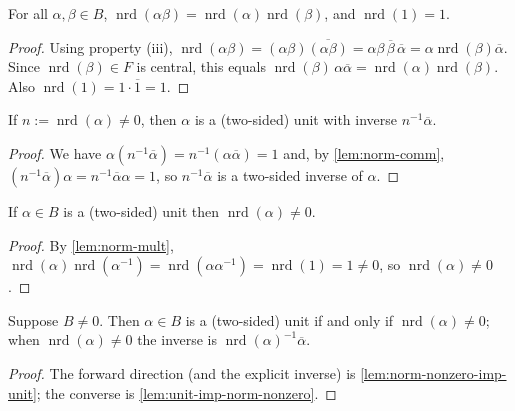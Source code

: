 \begin{lemma}
    \label{lem:norm-mult}
    For all $\alpha, \beta \in B$, $\operatorname{nrd}(\alpha\beta) =
    \operatorname{nrd}(\alpha)\operatorname{nrd}(\beta)$, and
    $\operatorname{nrd}(1) = 1$.
\end{lemma}
\begin{proof}
    Using property (iii), $\operatorname{nrd}(\alpha\beta) =
    (\alpha\beta)\overline{(\alpha\beta)} = \alpha\beta\,\overline\beta\,
    \overline\alpha = \alpha\operatorname{nrd}(\beta)\overline\alpha$. Since
    $\operatorname{nrd}(\beta) \in F$ is central, this equals
    $\operatorname{nrd}(\beta)\,\alpha\overline\alpha =
    \operatorname{nrd}(\alpha)\operatorname{nrd}(\beta)$. Also
    $\operatorname{nrd}(1) = 1\cdot\overline 1 = 1$.
\end{proof}

\begin{lemma}
    \label{lem:norm-nonzero-imp-unit}
    If $n := \operatorname{nrd}(\alpha) \neq 0$, then $\alpha$ is a (two-sided) unit
    with inverse $n^{-1}\overline{\alpha}$.
\end{lemma}
\begin{proof}
    We have $\alpha(n^{-1}\overline\alpha) = n^{-1}(\alpha\overline\alpha) = 1$ and,
    by \ref{lem:norm-comm}, $(n^{-1}\overline\alpha)\alpha =
    n^{-1}\overline\alpha\alpha = 1$, so $n^{-1}\overline\alpha$ is a two-sided
    inverse of $\alpha$.
\end{proof}

\begin{lemma}
    \label{lem:unit-imp-norm-nonzero}
    If $\alpha \in B$ is a (two-sided) unit then $\operatorname{nrd}(\alpha) \neq 0$.
\end{lemma}
\begin{proof}
    By \ref{lem:norm-mult}, $\operatorname{nrd}(\alpha)\operatorname{nrd}(\alpha^{-1})
    = \operatorname{nrd}(\alpha\alpha^{-1}) = \operatorname{nrd}(1) = 1 \neq 0$, so
    $\operatorname{nrd}(\alpha) \neq 0$.
\end{proof}

\begin{lemma}
    \label{lem:unit-iff-norm}
    Suppose $B \neq 0$. Then $\alpha \in B$ is a (two-sided) unit if and only if
    $\operatorname{nrd}(\alpha) \neq 0$; when $\operatorname{nrd}(\alpha) \neq 0$
    the inverse is $\operatorname{nrd}(\alpha)^{-1}\overline{\alpha}$.
\end{lemma}
\begin{proof}
    The forward direction (and the explicit inverse) is
    \ref{lem:norm-nonzero-imp-unit}; the converse is
    \ref{lem:unit-imp-norm-nonzero}.
\end{proof}

